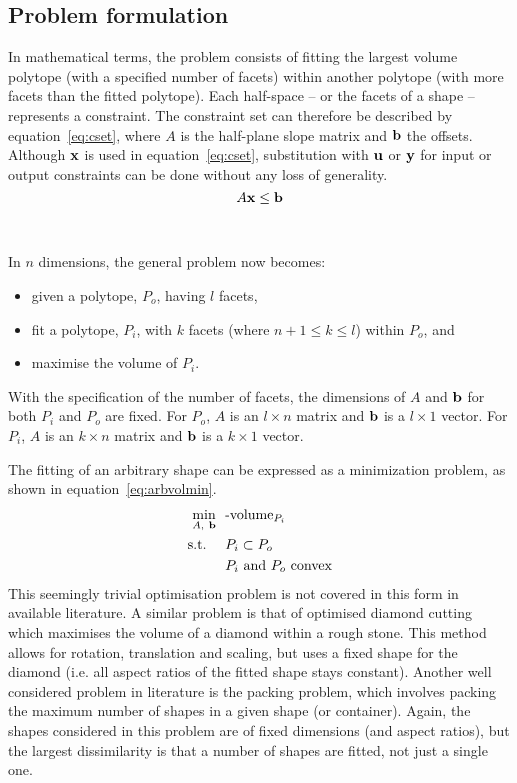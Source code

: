 \subsection{Problem formulation}
In mathematical terms, the problem consists of fitting the largest volume polytope (with a specified number of facets) within another polytope (with more facets than the fitted polytope).
Each half-space -- or the facets of a shape -- represents a constraint.
The constraint set can therefore be described by equation~\ref{eq:cset}, where $A$ is the half-plane slope matrix and ${\bf {b}}$ the offsets.
Although ${\bf {x}}$ is used in equation~\ref{eq:cset}, substitution with ${\bf {u}}$ or ${\bf {y}}$ for input or output constraints can be done without any loss of generality.
\begin{equation}
  \label{eq:cset}
  A{\bf {x}} \leq {\bf {b}}
\end{equation}
\\\\
In $n$ dimensions, the general problem now becomes: 
\begin{itemize}
  \item given a polytope, $P_o$, having $l$ facets,
  \item fit a polytope, $P_i$, with $k$ facets (where $n+1 \leq k \le l$) within $P_o$, and
  \item maximise the volume of $P_i$.
\end{itemize} 
With the specification of the number of facets, the dimensions of $A$ and ${\bf {b}}$ for both $P_i$ and $P_o$ are fixed.
For $P_o$, $A$ is an $l \times n$ matrix and ${\bf {b}}$ is a $l \times 1$ vector.
For $P_i$, $A$ is an $k \times n$ matrix and ${\bf {b}}$ is a $k \times 1$ vector.

The fitting of an arbitrary shape can be expressed as a minimization problem, as shown in equation~\ref{eq:arbvolmin}.
\begin{align}
  \label{eq:arbvolmin}
    \min_{A,~{\bf {b}}}~~&\text{-volume}_{P_i}\\
    \text{s.t.}~~~~ &P_i \subset P_o \notag \\
                    &P_i \text{~and~} P_o \text{~convex} \notag
\end{align}
This seemingly trivial optimisation problem is not covered in this form in available literature.
A similar problem is that of optimised diamond cutting \citep{diamondcut} which maximises the volume of a diamond within a rough stone.
This method allows for rotation, translation and scaling, but uses a fixed shape for the diamond (i.e. all aspect ratios of the fitted shape stays constant).
Another well considered problem in literature is the packing problem, which involves packing the maximum number of shapes in a given shape (or container).
Again, the shapes considered in this problem are of fixed dimensions (and aspect ratios), but the largest dissimilarity is that a number of shapes are fitted, not just a single one.

